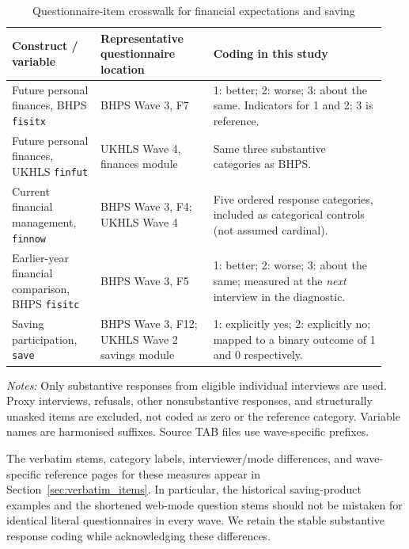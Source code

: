 \begin{table}[!htbp]
\centering
\caption{Questionnaire-item crosswalk for financial expectations and saving}
\label{tab:questionmap}
\begin{threeparttable}
\footnotesize
\setlength{\tabcolsep}{3.5pt}
\begin{tabular}{@{}p{0.22\linewidth}p{0.29\linewidth}p{0.43\linewidth}@{}}
\toprule
Construct / variable & Representative questionnaire location & Coding in this study\\
\midrule
Future personal finances, BHPS \texttt{fisitx} & BHPS Wave 3, F7 & 1: better; 2: worse; 3: about the same. Indicators for 1 and 2; 3 is reference.\\[4pt]
Future personal finances, UKHLS \texttt{finfut} & UKHLS Wave 4, finances module & Same three substantive categories as BHPS.\\[4pt]
Current financial management, \texttt{finnow} & BHPS Wave 3, F4; UKHLS Wave 4 & Five ordered response categories, included as categorical controls (not assumed cardinal).\\[4pt]
Earlier-year financial comparison, BHPS \texttt{fisitc} & BHPS Wave 3, F5 & 1: better; 2: worse; 3: about the same; measured at the \emph{next} interview in the diagnostic.\\[4pt]
Saving participation, \texttt{save} & BHPS Wave 3, F12; UKHLS Wave 2 savings module & 1: explicitly yes; 2: explicitly no; mapped to a binary outcome of 1 and 0 respectively.\\
\bottomrule
\end{tabular}
\begin{tablenotes}[flushleft]\footnotesize
\item \textit{Notes:} Only substantive responses from eligible individual interviews are used. Proxy interviews, refusals, other nonsubstantive responses, and structurally unasked items are excluded, not coded as zero or the reference category. Variable names are harmonised suffixes. Source TAB files use wave-specific prefixes.
\end{tablenotes}
\end{threeparttable}
\end{table}
\FloatBarrier

The verbatim stems, category labels, interviewer/mode differences, and wave-specific reference pages for these measures appear in Section~\ref{sec:verbatim_items}. In particular, the historical saving-product examples and the shortened web-mode question stems should not be mistaken for identical literal questionnaires in every wave. We retain the stable substantive response coding while acknowledging these differences.

